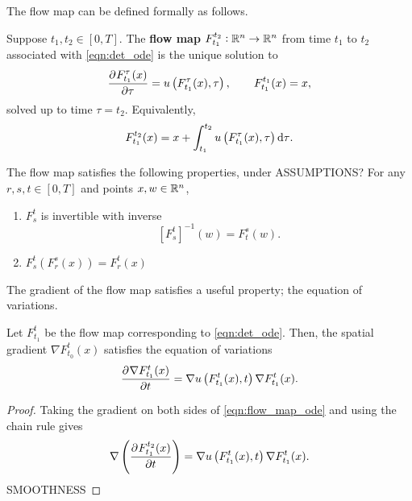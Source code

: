 The flow map can be defined formally as follows.
\begin{definition}
	Suppose \(t_1, t_2 \in [0,T]\).
	The \textbf{flow map} \(F_{t_1}^{t_2}: \mathbb{R}^n \to \mathbb{R}^n\) from time \(t_1\) to \(t_2\) associated with \eqref{eqn:det_ode} is the unique solution to
	\begin{equation}
		\dpd{F_{t_1}^{\tau}(x)}{\tau} = u\left(F_{t_1}^\tau(x), \tau\right), \qquad F_{t_1}^{t_1}(x) = x,
		\label{eqn:flow_map_ode}
	\end{equation}
	solved up to time \(\tau = t_2\).
	Equivalently,
	\[
		F_{t_1}^{t_2}(x) = x + \int_{t_1}^{t_2}{u\left(F_{t_1}^\tau(x), \tau\right)\dif\tau}.
	\]
\end{definition}
The flow map satisfies the following properties, under ASSUMPTIONS? 
For any \(r, s, t \in [0,T]\) and points \(x,w \in \mathbb{R}^n\),
\begin{enumerate}
	\item \(F_{s}^{t}\) is invertible with inverse
		\[
			\left[F_{s}^{t}\right]^{-1}\left(w\right) = F_{t}^{s}\left(w\right).
		\]
	\item \(F_s^{t}\left(F_{r}^{s}(x)\right) = F_{r}^{t}\left(x\right)\) 
\end{enumerate}

The gradient of the flow map satisfies a useful property; the equation of variations.
\begin{theorem}
	Let \(F_{t_1}^{t}\) be the flow map corresponding to \eqref{eqn:det_ode}.
	Then, the spatial gradient \(\nabla F_{t_0}^t(x)\) satisfies the equation of variations
	\begin{equation}
		\dpd{\nabla F_{t_1}^{t}(x)}{t} = \nabla u\left(F_{t_1}^{t}(x), t\right) \nabla F_{t_1}^{t}(x).
		\label{eqn:eqn_of_variations}
	\end{equation}
\end{theorem}
\begin{proof}
	Taking the gradient on both sides of \eqref{eqn:flow_map_ode} and using the chain rule gives
	\[
		\nabla\left(\dpd{F_{t_1}^{t_2}(x)}{t}\right) = \nabla u\left(F_{t_1}^{t}(x), t\right) \nabla F_{t_1}^{t}(x).
	\]
	SMOOTHNESS
\end{proof}



